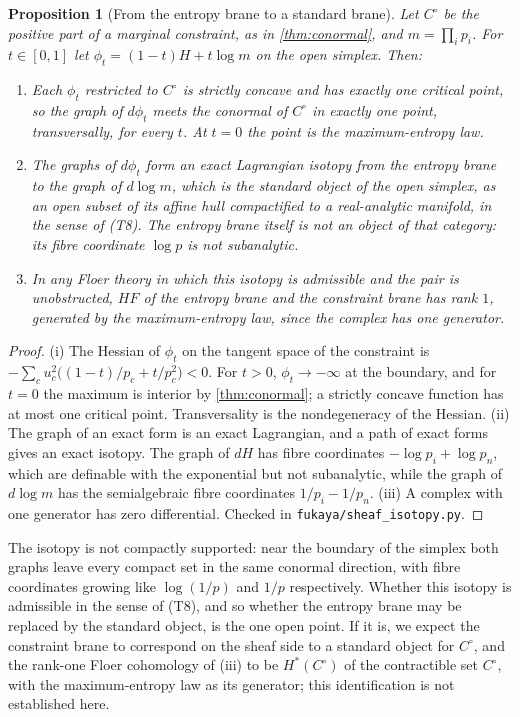 \documentclass[11pt]{article}
\newtheorem{proposition}[theorem]{Proposition}
\theoremstyle{definition}
\theoremstyle{remark}
\begin{document}
\begin{proposition}[From the entropy brane to a standard brane]\label{prop:sheaf}
Let $C^\circ$ be the positive part of a marginal constraint, as in \cref{thm:conormal}, and $m=\prod_ip_i$. For $t\in[0,1]$ let
$\phi_t=(1-t)H+t\log m$ on the open simplex. Then:
\begin{enumerate}[label=(\roman*)]
\item Each $\phi_t$ restricted to $C^\circ$ is strictly concave and has exactly one critical point, so the graph of $d\phi_t$ meets the
  conormal of $C^\circ$ in exactly one point, transversally, for every $t$. At $t=0$ the point is the maximum-entropy law.
\item The graphs of $d\phi_t$ form an exact Lagrangian isotopy from the entropy brane to the graph of $d\log m$, which is the standard
  object of the open simplex, as an open subset of its affine hull compactified to a real-analytic manifold, in the sense of (T8). The
  entropy brane itself is not an object of that category: its fibre coordinate $\log p$ is not subanalytic.
\item In any Floer theory in which this isotopy is admissible and the pair is unobstructed, $HF$ of the entropy brane and the constraint
  brane has rank $1$, generated by the maximum-entropy law, since the complex has one generator.
\end{enumerate}
\end{proposition}
\begin{proof}
(i) The Hessian of $\phi_t$ on the tangent space of the constraint is $-\sum_c u_c^2\big((1-t)/p_c+t/p_c^2\big)<0$. For $t>0$, $\phi_t\to-\infty$ at the
boundary, and for $t=0$ the maximum is interior by \cref{thm:conormal}; a strictly concave function has at most one critical point.
Transversality is the nondegeneracy of the Hessian. (ii) The graph of an exact form is an exact Lagrangian, and a path of exact forms gives an
exact isotopy. The graph of $dH$ has fibre coordinates $-\log p_i+\log p_n$, which are definable with the exponential but not subanalytic,
while the graph of $d\log m$ has the semialgebraic fibre coordinates $1/p_i-1/p_n$. (iii) A complex with one generator has zero differential. Checked in \texttt{fukaya/sheaf\_isotopy.py}.
\end{proof}

The isotopy is not compactly supported: near the boundary of the simplex both graphs leave every compact set in the same conormal direction,
with fibre coordinates growing like $\log(1/p)$ and $1/p$ respectively. Whether this isotopy is admissible in the sense of (T8), and so whether
the entropy brane may be replaced by the standard object, is the one open point. If it is, we expect the constraint brane to correspond on the sheaf
side to a standard object for $C^\circ$, and the rank-one Floer cohomology of (iii) to be $H^*(C^\circ)$ of the contractible set $C^\circ$, with the
maximum-entropy law as its generator; this identification is not established here.
\end{document}
